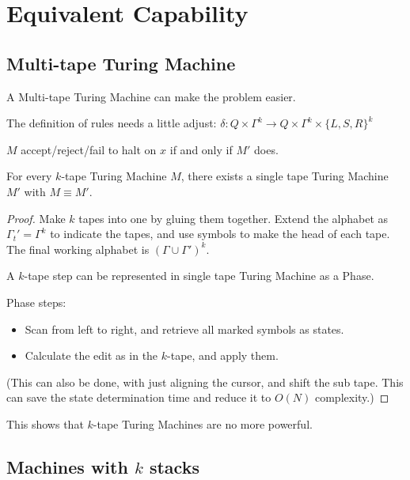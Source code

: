 \section{Equivalent Capability}

\subsection{Multi-tape Turing Machine}

A Multi-tape Turing Machine can make the problem easier.

The definition of rules needs a little adjust:
\(\delta: Q \times \Gamma^k \rightarrow Q \times \Gamma^k \times \{L,S,R\}^k\)

\begin{definition}[Equivalent]
\(M\) accept/reject/fail to halt on $x$ if and only if \(M'\) does.
\end{definition}

\begin{theorem}
For every \(k\)-tape Turing Machine \(M\), there exists a single tape Turing
Machine \(M'\) with \(M \equiv M'\).
\end{theorem}


\begin{proof}
Make $k$ tapes into one by gluing them together. Extend the alphabet as
\(\Gamma_{t}' = \Gamma^k\) to indicate the tapes, and use symbols to
make the head of each tape. The final working alphabet is
\((\Gamma \cup \Gamma' )^k\).

A $k$-tape step can be represented in single tape Turing Machine as a
Phase.

Phase steps:

\begin{itemize}
\item
  Scan from left to right, and retrieve all marked symbols as states.
\item
  Calculate the edit as in the $k$-tape, and apply them.
\end{itemize}

(This can also be done, with just aligning the cursor, and shift the sub
tape. This can save the state determination time and reduce it to
\(O(N)\) complexity.)
\end{proof}

This shows that \(k\)-tape Turing Machines are no more powerful. 

\subsection{Machines with \texorpdfstring{\(k\)}{k} stacks}

